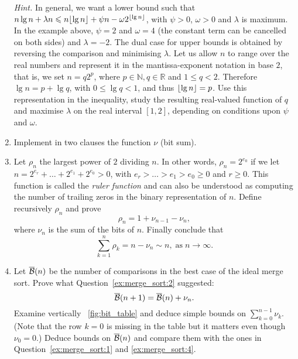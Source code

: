 \begin{enumerate}
    \noindent \emph{Hint.} In general, we want a lower bound such that
    \(n\lg n + \lambda n \leqslant n\lfloor{\lg n}\rfloor + \psi n - \omega
    2^{\lfloor{\lg n}\rfloor}\), with \(\psi > 0\), \(\omega > 0\) and
    \(\lambda\) is maximum. In the example above, \(\psi = 2\) and
    \(\omega = 4\) (the constant term can be cancelled on both sides)
    and \(\lambda = -2\). The dual case for upper bounds is obtained
    by reversing the comparison and minimising \(\lambda\). Let us
    allow \(n\) to range over the real numbers and represent it in the
    mantissa\hyp{}exponent notation in base \(2\), that is, we set
    \(n=q2^p\), where \(p \in \mathbb{N}, q \in \mathbb{R}\) and \(1
    \leqslant q < 2\). Therefore \(\lg n = p + \lg q\), with \(0
    \leqslant \lg q < 1\), and thus \(\lfloor{\lg n}\rfloor = p\). Use this
    representation in the inequality, study the resulting
    real\hyp{}valued function of \(q\) and maximise \(\lambda\) on the
    real interval \([1,2]\), depending on conditions upon \(\psi\) and
    \(\omega\).

  \item \label{ex:merge_sort:5} Implement in two \Erlang clauses the
    function \(\nu\) (bit sum).

  \item \label{ex:merge_sort:6} Let \(\rho_n\) the largest power of
    \(2\) dividing \(n\). In other words, \(\rho_n = 2^{e_0}\) if we
    let \(n=2^{e_r} + \dots + 2^{e_1} + 2^{e_0} > 0\), with \(e_r >
    \dots > e_1 > e_0 \geqslant 0\) and \(r \geqslant 0\). This
    function is called the \emph{ruler function} and can also be
    understood as computing the number of trailing zeros in the binary
    representation of \(n\). Define recursively \(\rho_n\) and prove
    \[
    \rho_n = 1 + \nu_{n-1} - \nu_{n},
    \]
    where \(\nu_n\) is the sum of the bits of \(n\). Finally conclude that
    \[
      \sum_{k=1}^{n}{\rho_k} = n - \nu_n \sim n,\; \text{as} \; n
      \rightarrow \infty.
    \]

  \item \label{ex:merge_sort:7} Let \(\overline{\mathcal{B}}(n)\) be the number of
    comparisons in the best case of the ideal merge sort. Prove what
    Question~\ref{ex:merge_sort:2} suggested:
    \[
    \overline{\mathcal{B}}(n+1) = \overline{\mathcal{B}}(n) + \nu_{n}.
    \]
    Examine vertically \fig~\vref{fig:bit_table} and deduce simple
    bounds on \(\sum_{k=0}^{n-1}{\nu_k}\). (Note that the row \(k=0\)
    is missing in the table but it matters even though \(\nu_0 = 0\).)
    Deduce bounds on \(\overline{\mathcal{B}}(n)\) and compare them with the ones in
    Question~\ref{ex:merge_sort:1} and \ref{ex:merge_sort:4}.


\end{enumerate}
